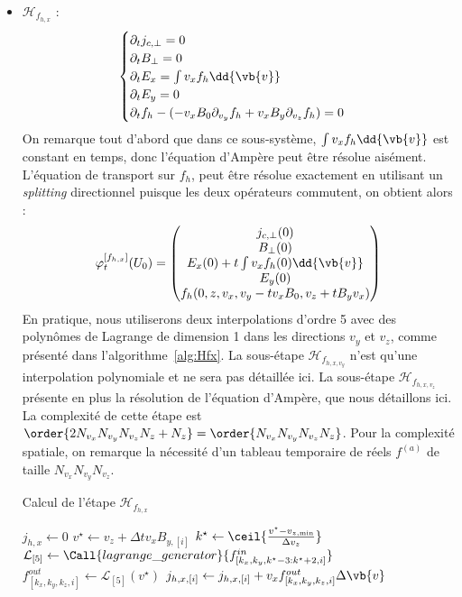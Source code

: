 \begin{itemize}
  \item $\mathcal{H}_{f_{h,x}}$ :
    $$
      \begin{cases}
        \partial_t j_{c,\perp} = 0 \\
        \partial_t B_{\perp} = 0 \\
        \partial_t E_{x} = \int v_xf_h\dd{\vb{v}} \\
        \partial_t E_{y} = 0 \\
        \partial_t f_h - (-v_xB_0\partial_{v_y}f_h + v_xB_y\partial_{v_z}f_h) = 0
      \end{cases}
    $$
    On remarque tout d'abord que dans ce sous-système, $\int v_xf_h\dd{\vb{v}}$ est constant en temps, donc l'équation d'Ampère peut être résolue aisément. L'équation de transport sur $f_h$, peut être résolue exactement en utilisant un \emph{splitting} directionnel puisque les deux opérateurs commutent, on obtient alors :
    $$
      \varphi_t^{[f_{h,x}]}(U_0) = \begin{pmatrix}
        j_{c,\perp}(0) \\
        B_{\perp}(0) \\
        E_x(0) + t\int v_xf_h(0)\dd{\vb{v}} \\
        E_y(0) \\
        f_h(0,z,v_x,v_y-tv_xB_0,v_z+tB_yv_x)
      \end{pmatrix}
    $$
    En pratique, nous utiliserons deux interpolations d'ordre 5 avec des polynômes de Lagrange de dimension 1 dans les directions $v_y$ et $v_z$, comme présenté dans l'algorithme~\ref{alg:Hfx}. La sous-étape $\mathcal{H}_{f_{h,x,v_y}}$ n'est qu'une interpolation polynomiale et ne sera pas détaillée ici. La sous-étape $\mathcal{H}_{f_{h,x,v_z}}$ présente en plus la résolution de l'équation d'Ampère, que nous détaillons ici. La complexité de cette étape est $\order{2N_{v_x}N_{v_y}N_{v_z}N_z + N_z} = \order{N_{v_x}N_{v_y}N_{v_z}N_z}$. Pour la complexité spatiale, on remarque la nécessité d'un tableau temporaire de réels $f^{(a)}$ de taille $N_{v_x}N_{v_y}N_{v_z}$.
    \begin{algorithm}
      \caption{Calcul de l'étape $\mathcal{H}_{f_{h,x}}$}
      \label{alg:Hfx}
      \begin{algorithmic}[1]
          \State $j_{h,x} \gets 0$ 
          \ForAll{$(k_x,k_y,k_z)\in[\![0,N_{v_x}[\![\times[\![0,N_{v_y}[\![\times[\![0,N_{v_z}[\![$}
              \State $v^{\star} \gets v_z + \Delta t v_x B_{y,[i]}$
              \State $k^{\star} \gets \ceil{\frac{ v^{\star}-v_{z,\text{min}} }{ \Delta v_z }}$
              \State $\mathcal{L}_{[5]} \gets \Call{lagrange\_generator}{f^{in}_{[k_x,k_y,k^\star-3:k^\star+2,i]}}$
              \State $f^{out}_{[k_x,k_y,k_z,i]} \gets \mathcal{L}_{[5]}( v^{\star} )$
              \State $j_{h,x,[i]} \gets j_{h,x,[i]} + v_x f^{out}_{[k_x,k_y,k_z,i]} \Delta\vb{v}$
            \EndFor
          \EndFor


\end{algorithmic}
\end{algorithm}
\end{itemize}
